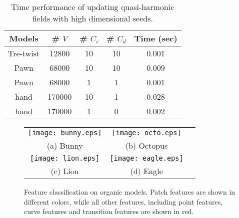 \documentclass[10pt,journal,cspaper,compsoc]{IEEEtran}
\begin{document}
\begin{table}[t]
\renewcommand{\arraystretch}{1.3}
    \label{table:1}
    \caption{Time performance of updating quasi-harmonic fields with high dimensional seeds.}
    \centering
    \begin{tabular}{c||c |c |c|c}
    \hline Models            &\# $V$ & \# $C_{i}$     & \# $C_{d}$          & Time (sec) \\
    \hline\hline   Tre-twist &12800  & 10 &  10 & 0.001 \\
     \hline  Pawn &68000                     & 10                       &  10                     & 0.009 \\
    \hline   Pawn &68000                      & 1                        &  1                      & 0.001 \\
    \hline   hand &170000                     & 10                       &  1                      & 0.028 \\
    \hline   hand &170000                     & 1                        &  0                      & 0.002 \\
    \hline
    \end{tabular}
\end{table}

\begin{figure*}[t]
\begin{center}
    \begin{tabular}{@{}c@{} @{}c@{} @{}c@{}}
       \texttt{[image: bunny.eps]}&
        \texttt{[image: octo.eps]}\\
         (a) Bunny & (b) Octopus \\
        \texttt{[image: lion.eps]}&
       \texttt{[image: eagle.eps]}\\
 (c) Lion & (d) Eagle\\
    \end{tabular}
    \caption{Feature classification on organic models.
    Patch features are shown in different colors,
    while all other features, including point features,
    curve features and transition features are shown in red.}
    \label{fig:general}
\end{center}
\end{figure*}
\end{document}
